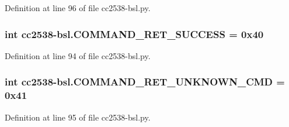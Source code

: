 Definition at line 96 of file cc2538-\/bsl.\+py.

\subsubsection[{\texorpdfstring{C\+O\+M\+M\+A\+N\+D\+\_\+\+R\+E\+T\+\_\+\+S\+U\+C\+C\+E\+SS}{COMMAND_RET_SUCCESS}}]{\setlength{\rightskip}{0pt plus 5cm}int cc2538-\/bsl.\+C\+O\+M\+M\+A\+N\+D\+\_\+\+R\+E\+T\+\_\+\+S\+U\+C\+C\+E\+SS = 0x40}\hypertarget{namespacecc2538-bsl_a9d2b2cd58cea80dd935b10fa0796efa1}{}\label{namespacecc2538-bsl_a9d2b2cd58cea80dd935b10fa0796efa1}


Definition at line 94 of file cc2538-\/bsl.\+py.

\subsubsection[{\texorpdfstring{C\+O\+M\+M\+A\+N\+D\+\_\+\+R\+E\+T\+\_\+\+U\+N\+K\+N\+O\+W\+N\+\_\+\+C\+MD}{COMMAND_RET_UNKNOWN_CMD}}]{\setlength{\rightskip}{0pt plus 5cm}int cc2538-\/bsl.\+C\+O\+M\+M\+A\+N\+D\+\_\+\+R\+E\+T\+\_\+\+U\+N\+K\+N\+O\+W\+N\+\_\+\+C\+MD = 0x41}\hypertarget{namespacecc2538-bsl_a10516a88ce45b7211739a7ceecd54fd2}{}\label{namespacecc2538-bsl_a10516a88ce45b7211739a7ceecd54fd2}


Definition at line 95 of file cc2538-\/bsl.\+py.

